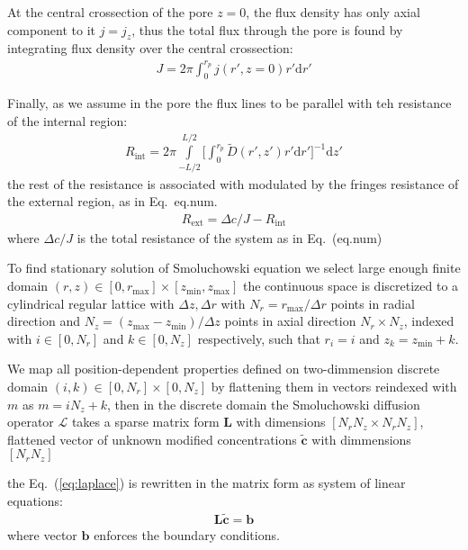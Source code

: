 \documentclass[12pt, a4paper]{article}
\begin{document}
At the central crossection of the pore $z=0$, the flux density has only axial component to it $j=j_z$, thus the total flux through the pore is found by integrating flux density over the central crossection:
\begin{eqnarray}
    J = 2\pi\int_{0}^{r_p}j(r',z=0) r' \text{d}r'
\end{eqnarray}

Finally, as we assume in the pore the flux lines to be parallel with teh resistance of the internal region:
\begin{eqnarray}
    R_{\text{int}} = 2 \pi \int\limits_{-L/2}^{L/2} \Bigg[\int_{0}^{r_p} \tilde{D}(r',z') r' \text{d}r' \Bigg]^{-1} \text{d}z'
\end{eqnarray}
the rest of the resistance is associated with modulated by the fringes resistance of the external region, as in Eq.~{eq.num}.
\begin{eqnarray}
    R_{\text{ext}} = \Delta c/J - R_{\text{int}}
\end{eqnarray}
where  $\Delta c/J$ is the total resistance of the system as in Eq.~(eq.num)

To find stationary solution of Smoluchowski equation we select large enough finite domain  $(r,z) \in [0, r_{\text{max}}] \times [z_{\text{min}}, z_{\text{max}}]$ the continuous space is discretized to a cylindrical regular lattice with $\Delta z, \Delta r$ with $N_r = r_{\text{max}}/\Delta r$ points in radial direction and $N_z = (z_{\text{max}} - z_{\text{min}})/\Delta z$ points in axial direction $N_r \times N_z$, indexed with $i \in [0, N_r]$ and $k \in [0, N_z]$ respectively, such that $r_i = i$ and $z_k =  z_{\text{min}} + k$.

We map all position-dependent properties defined on two-dimmension discrete domain $(i, k) \in [0, N_r]\times[0, N_z]$ by flattening them in vectors reindexed with $m$ as $m = i N_z + k$, then in the discrete domain the Smoluchowski diffusion operator $\mathcal{L}$ takes a sparse matrix form $\mathbf{L}$ with dimensions $[N_r N_z \times N_r N_z]$,  flattened vector of unknown modified concentrations $\tilde{\bm{c}}$ with dimmensions $[N_r N_z]$

the Eq.~(\ref{eq:laplace}) is rewritten in the matrix form as system of linear equations:
\begin{eqnarray}
    \mathbf{L} \tilde{\bm{c}} = \bm{b}
    \label{eq:matrix_form}
\end{eqnarray}
where vector $\bm{b}$ enforces the boundary conditions.
\end{document}
